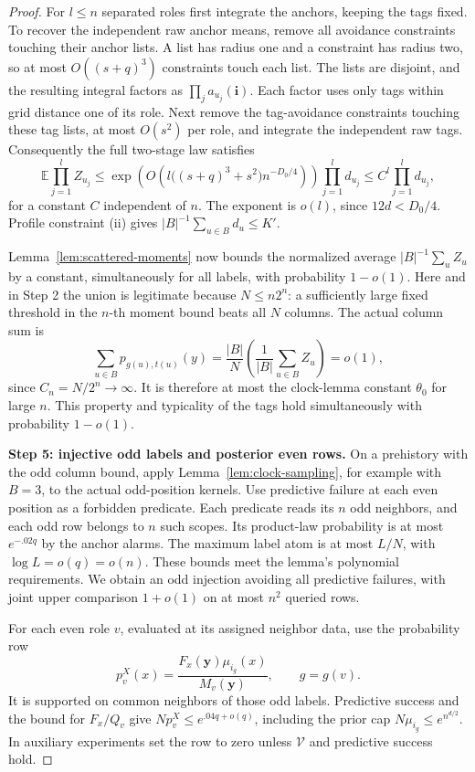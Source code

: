 \begin{proof}
For \(l\le n\) separated roles first integrate the anchors, keeping the
tags fixed. To recover the independent raw anchor means, remove all
avoidance constraints touching their anchor lists. A list has radius
one and a constraint has radius two, so at most \(O((s+q)^3)\)
constraints touch each list. The lists are disjoint, and the resulting
integral factors as \(\prod_j a_{u_j}(\mathbf i)\). Each factor uses
only tags within grid distance one of its role. Next remove the
tag-avoidance constraints touching these tag lists, at most \(O(s^2)\)
per role, and integrate the independent raw tags. Consequently the full
two-stage law satisfies
\[
 \mathbb E\prod_{j=1}^l Z_{u_j}
 \le \exp\!\left(O\!\left(l\big((s+q)^3+s^2\big)n^{-D_0/4}\right)\right)
       \prod_{j=1}^l d_{u_j}
 \le C^l\prod_{j=1}^l d_{u_j},
\]
for a constant \(C\) independent of \(n\). The exponent is \(o(l)\), since
\(12d<D_0/4\). Profile constraint (ii) gives
\(|B|^{-1}\sum_{u\in B}d_u\le K'\).

Lemma~\ref{lem:scattered-moments} now bounds the normalized average
\(|B|^{-1}\sum_u Z_u\) by a constant, simultaneously for all labels,
with probability \(1-o(1)\). Here and in Step 2 the union is legitimate
because \(N\le n2^n\): a sufficiently large fixed threshold in the
\(n\)-th moment bound beats all \(N\) columns. The actual column sum is
\[
 \sum_{u\in B}p_{g(u),t(u)}(y)
 =\frac{|B|}{N}\left(\frac1{|B|}\sum_{u\in B}Z_u\right)=o(1),
\]
since \(C_n=N/2^n\to\infty\). It is therefore at most the clock-lemma
constant \(\theta_0\) for large \(n\). This property and typicality of
the tags hold simultaneously with probability \(1-o(1)\).

\noindent\textbf{Step 5: injective odd labels and posterior even rows.}\quad
On a prehistory with the odd column bound, apply
Lemma~\ref{lem:clock-sampling}, for example with \(B=3\), to the actual
odd-position kernels. Use predictive failure at each even position as
a forbidden predicate. Each predicate reads its \(n\) odd neighbors,
and each odd row belongs to \(n\) such scopes. Its product-law
probability is at most \(e^{-.02q}\) by the anchor alarms. The maximum
label atom is at most \(L/N\), with \(\log L=o(q)=o(n)\). These bounds
meet the lemma's polynomial requirements. We obtain an odd injection
avoiding all predictive failures, with joint upper comparison
\(1+o(1)\) on at most \(n^2\) queried rows.

For each even role \(v\), evaluated at its assigned neighbor data, use
the probability row
\[
 p_v^X(x)=\frac{F_x(\mathbf y)\mu_{i_g}(x)}{M_v(\mathbf y)},
 \qquad g=g(v).
\]
It is supported on common neighbors of those odd labels. Predictive
success and the bound for \(F_x/Q_v\) give
\(Np_v^X\le e^{.04q+o(q)}\), including the prior cap
\(N\mu_{i_g}\le e^{n^{d/2}}\). In auxiliary experiments set the row
to zero unless \(\mathcal V\) and predictive success hold.


\end{proof}
